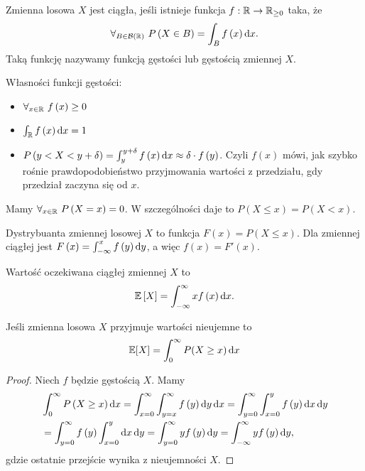 \begin{definition}
    Zmienna losowa \(X\) jest ciągła, jeśli istnieje funkcja \(f: \mathbb{R}\to \mathbb{R}_{\ge 0}\) taka, że 
    \[\forall_{B\in \mathcal{B\left( \mathbb{R} \right) }} \ P\left( X\in B  \right) = \int_{B} f\left( x  \right) \mathop{}\!\mathrm{d} x .\]
    Taką funkcję nazywamy funkcją gęstości lub gęstością zmiennej \(X\).
\end{definition}

    Własności funkcji gęstości:
    \begin{itemize}
        \item \(\forall_{x\in \mathbb{R}} \ f\left( x  \right) \ge 0 \)
        \item \(\int_{\mathbb{R}} f\left( x  \right) \mathop{}\!\mathrm{d} x = 1\)
        \item \(P\left( y<X<y+\delta \right) = \int_{y}^{y+\delta} f\left( x  \right) \mathop{}\!\mathrm{d} x \approx \delta\cdot f\left( y \right)  \). Czyli \(f\left( x  \right) \) mówi, jak szybko rośnie prawdopodobieństwo przyjmowania wartości z przedziału, gdy przedział zaczyna się od \(x\).
    \end{itemize}

    Mamy \(\forall_{x\in \mathbb{R}} \ P\left( X=x \right) =0 \). W szczególności daje to \(P\left( X\le x  \right) = P\left( X<x \right) \).

\begin{definition}
    Dystrybuanta zmiennej losowej \(X\) to funkcja \(F\left( x  \right) = P\left( X\le x  \right) \). Dla zmiennej ciągłej jest \(F\left( x  \right) = \int_{-\infty}^{x} f\left( y  \right) \mathop{}\!\mathrm{d} y \), a więc \(f\left( x  \right) = F'\left( x  \right) \).
\end{definition}

\begin{definition}
    Wartość oczekiwana ciągłej zmiennej \(X\) to 
    \[ \mathbb{E}\left[  X \right] = \int_{-\infty}^{\infty} x f\left( x  \right) \mathop{}\!\mathrm{d} x  .\] 
\end{definition}


\begin{lemma}[Lemat 8.1 P\&C]
    \label{continuous-positive-random-variable-lemma}
    Jeśli zmienna losowa \(X\) przyjmuje wartości nieujemne to
    \[
        \expected{X} = \int_0^\infty P(X \geq x) \diff x
    \]
\end{lemma}
\begin{proof}
    Niech \(f\) będzie gęstością \(X\). Mamy
    \begin{align*}
       & \int_{0}^{\infty} P\left( X\ge x  \right) \diff x = \int_{x=0}^{\infty}  \int_{y=x}^{\infty} f\left( y  \right) \diff y \diff x = \int_{y=0}^{\infty} \int_{x=0}^{y} f\left( y  \right) \diff x \diff y \\ 
        &= \int_{y=0}^{\infty} f\left( y  \right) \int_{x=0}^{y} \diff x \diff y = \int_{y=0}^{\infty} y f\left( y  \right) \diff y = \int_{-\infty}^{\infty} y f\left( y  \right) \diff y,
    \end{align*}
    gdzie ostatnie przejście wynika z nieujemności \(X\).
\end{proof}

